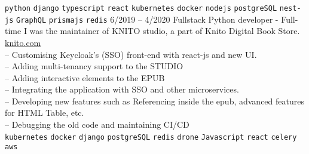 \begin{entrylist}
{        \texttt{python}\slashsep
        \texttt{django}\slashsep
        \texttt{typescript}\slashsep
        \texttt{react}\slashsep
        \texttt{kubernetes}\slashsep
        \texttt{docker}\slashsep
        \texttt{nodejs}\slashsep
        \texttt{postgreSQL}\slashsep
        \texttt{nest-js}\slashsep
        \texttt{GraphQL}\slashsep
        \texttt{prismajs}\slashsep
        \texttt{redis}\slashsep
    }
    \entry
    {6/2019 -- 4/2020}
    {Fullstack Python developer - Full-time}
    {}
    {
        I was the maintainer of KNITO studio, a part of Knito Digital Book Store.
        \href{https://knito.com/}{knito.com} \\
        -- Customising Keycloak's (SSO) front-end with react-js and new UI. \\
        -- Adding multi-tenancy support to the STUDIO \\
        -- Adding interactive elements to the EPUB \\
        -- Integrating the application with SSO and other microservices. \\
        -- Developing new features such as Referencing inside the epub, advanced features for HTML Table, etc. \\
        -- Debugging the old code and maintaining CI/CD \\
        \texttt{kubernetes}\slashsep
        \texttt{docker}\slashsep
        \texttt{django}\slashsep
        \texttt{postgreSQL}\slashsep
        \texttt{redis}\slashsep
        \texttt{drone}\slashsep
        \texttt{Javascript}\slashsep
        \texttt{react}\slashsep
        \texttt{celery}\slashsep
        \texttt{aws}\slashsep
    }


\end{entrylist}
